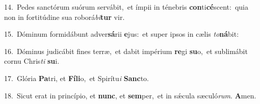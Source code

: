 {\numbfont\textcolor{\numbcolor}{14.}}~Pedes sanctórum suórum servábit,~\dagger et ímpii in ténebris \textbf{con}\-ti\-\textbf{cé}\-scent:~\star quia non in fortitúdine sua roborá\-\textit{bi}\-\textbf{tur} vir.\par
{\numbfont\textcolor{\numbcolor}{15.}}~Dóminum formidábunt adver\-\textbf{sá}\-rii \textbf{e}\-jus:~\star et super ipsos in cælis \textit{to}\-\textbf{ná}bit:\par
{\numbfont\textcolor{\numbcolor}{16.}}~Dóminus judicábit fines terræ,~\dagger et dabit impérium \textbf{re}\-gi \textbf{su}\-o,~\star et sublimábit cornu Chris\textit{ti} \textbf{su}\-i.\par
{\numbfont\textcolor{\numbcolor}{17.}}~Glória \textbf{Pa}\-tri, et \textbf{Fí}\-\textbf{li}o,~\star et Spirítu\textit{i} \textbf{Sanc}\-to.\par
{\numbfont\textcolor{\numbcolor}{18.}}~Sicut erat in princípio, et \textbf{nunc}\-, et \textbf{sem}\-per,~\star et in sǽcula sæculó\-\textit{rum}\-. \textbf{A}\-men.\par

